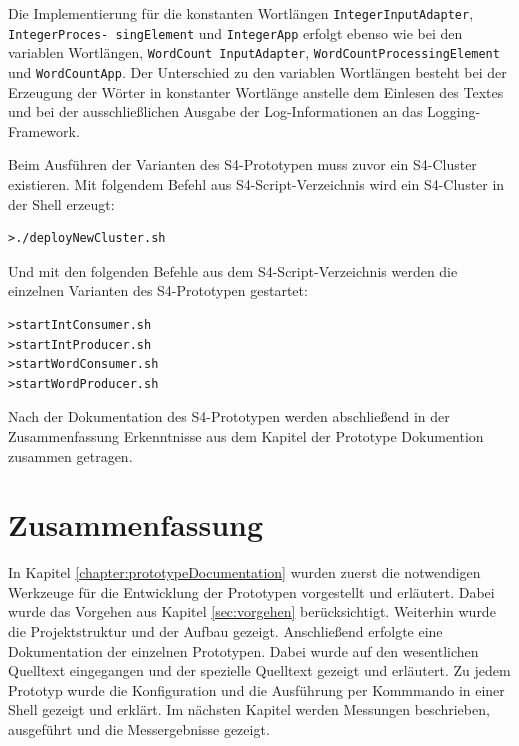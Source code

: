 

Die Implementierung für die konstanten Wortlängen \texttt{IntegerInputAdapter}, \texttt{IntegerProces- singElement} und \texttt{IntegerApp} erfolgt ebenso wie bei den variablen Wortlängen, \texttt{WordCount InputAdapter}, \texttt{WordCountProcessingElement} und \texttt{WordCountApp}. Der Unterschied zu den variablen Wortlängen besteht bei der Erzeugung der Wörter in konstanter Wortlänge anstelle dem Einlesen des Textes und bei der ausschließlichen Ausgabe der Log-Informationen an das Logging-Framework.

Beim Ausführen der Varianten des S4-Prototypen muss zuvor ein S4-Cluster existieren. Mit folgendem Befehl aus S4-Script-Verzeichnis wird ein S4-Cluster in der Shell erzeugt:

\begin{verbatim}
>./deployNewCluster.sh
\end{verbatim}

Und mit den folgenden Befehle aus dem S4-Script-Verzeichnis werden die einzelnen Varianten des S4-Prototypen gestartet:

\begin{verbatim}
>startIntConsumer.sh
>startIntProducer.sh
>startWordConsumer.sh
>startWordProducer.sh
\end{verbatim}

Nach der Dokumentation des S4-Prototypen werden abschließend in der Zusammenfassung Erkenntnisse aus dem Kapitel der Prototype Dokumention zusammen getragen.


\section{Zusammenfassung}

In Kapitel \ref{chapter:prototypeDocumentation} wurden zuerst die notwendigen Werkzeuge für die Entwicklung der Prototypen vorgestellt und erläutert. Dabei wurde das Vorgehen aus Kapitel \ref{sec:vorgehen} berücksichtigt. Weiterhin wurde die Projektstruktur und der Aufbau gezeigt. Anschließend erfolgte eine Dokumentation der einzelnen Prototypen. Dabei wurde auf den wesentlichen Quelltext eingegangen und der spezielle Quelltext gezeigt und erläutert. Zu jedem Prototyp wurde die Konfiguration und die Ausführung per Kommmando in einer Shell gezeigt und erklärt. Im nächsten Kapitel werden Messungen beschrieben, ausgeführt und die Messergebnisse gezeigt.
